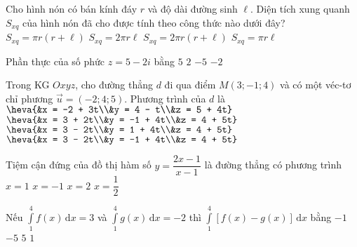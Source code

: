 \begin{ex}%
Cho hình nón có bán kính đáy $r$ và độ dài đường sinh $\ell$. Diện tích xung quanh $S_{xq}$ của hình nón đã cho được tính theo công thức nào dưới đây?
\choice
{$S_{xq} = \pi r(r + \ell)$}
{$S_{xq} = 2 \pi r\ell$}
{$S_{xq} = 2 \pi r(r +\ell)$}
{\True $S_{xq} = \pi r\ell$}
\end{ex}

\begin{ex}%
Phần thực của số phức $z = 5 - 2i$ bằng
\choice
{\True $5$}
{$2$}
{$-5$}
{$-2$}
\end{ex}

\begin{ex}%
Trong KG $Oxyz$, cho đường thẳng $d$ đi qua điểm $M(3; -1; 4)$ và có một véc-tơ chỉ phương $\vec{u} = (-2; 4; 5)$. Phương trình của $d$ là
\choice
{$\heva{&x = -2 + 3t\\&y = 4 - t\\&z = 5 + 4t}$}
{$\heva{&x = 3 + 2t\\&y = -1 + 4t\\&z = 4 + 5t}$}
{$\heva{&x = 3 - 2t\\&y = 1 + 4t\\&z = 4 + 5t}$}
{\True $\heva{&x = 3 - 2t\\&y = -1 + 4t\\&z = 4 + 5t}$}
\end{ex}

\begin{ex}%
Tiệm cận đứng của đồ thị hàm số $y = \dfrac{2x - 1}{x - 1}$ là đường thẳng có phương trình
\choice
{\True $x = 1$}
{$x = -1$}
{$x = 2$}
{$x = \dfrac{1}{2}$}
\end{ex}

\begin{ex}%
Nếu $\displaystyle\int\limits_1^4 f(x) \mathrm{\,d} x=3$ và $\displaystyle\int\limits_1^4 g(x) \mathrm{\,d}x = -2$ thì $\displaystyle\int\limits_1^4[f(x)-g(x)] \mathrm{\,d}x$ bằng
\choice
{$-1$}
{$-5$}
{\True $5$}
{$1$}
\end{ex}

